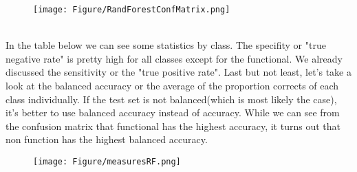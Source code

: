 \begin{figure}[h]
\texttt{[image: Figure/RandForestConfMatrix.png]}
\centering
\end{figure}\\
In the table below we can see some statistics by class. The specifity or "true negative rate" is pretty high for all classes except for the functional. We already discussed the sensitivity or the "true positive rate". Last but not least, let's take a look at the balanced accuracy or the average of the proportion corrects of each class individually. If the test set is not balanced(which is most likely the case), it's better to use balanced accuracy instead of accuracy. While we can see from the confusion matrix that functional has the highest accuracy, it turns out that non function has the highest balanced accuracy.
\begin{figure}[h]
\texttt{[image: Figure/measuresRF.png]}
\centering
\end{figure}

